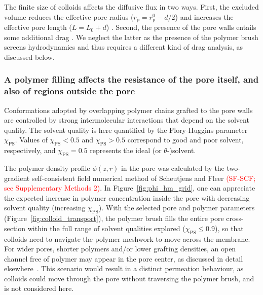 \documentclass[12pt, a4paper]{article}
\newcommand\todo[1]{\textcolor{red}{#1}}
\begin{document}
The finite size of colloids affects the diffusive flux in two ways.
First, the excluded volume reduces the effective pore radius ($r_{\text{p}} = r_{\text{p}}^0 - d/2$) and increases the effective pore length ($L = L_0 + d$) \cite{Renkin1954, Beck1970, Bungay1973, Anderson1974, Brenner1977}.
Second, the presence of the pore walls entails some additional drag \cite{Ladenburg1907, Faxen1922, Haberman1958}.
We neglect the latter as the presence of the polymer brush screens hydrodynamics and thus requires a different kind of drag analysis, as discussed below.


\subsubsection{A polymer filling affects the resistance of the pore itself, and also of regions outside the pore}

Conformations adopted by overlapping polymer chains grafted to the pore walls are controlled by strong intermolecular interactions that depend on the solvent quality.
The solvent quality is here quantified by the Flory-Huggins parameter $\chi_{\text{PS}}$.
Values of $\chi_{\text{PS}}<0.5$ and $\chi_{\text{PS}}>0.5$ correspond to good and poor solvent, respectively, and $\chi_{\text{PS}}=0.5$ represents the ideal (or $\theta$-)solvent.

The polymer density profile $\phi(z,r)$ in the pore was calculated by the two-gradient self-consistent field numerical method of Scheutjens and Fleer 
\todo{(SF-SCF; see Supplementary Methods 2)}. 
In Figure~\ref{fig:phi_hm_grid}, one can appreciate the expected increase in polymer concentration inside the pore with decreasing solvent quality (increasing $\chi_{\text{PS}}$).
With the selected pore and polymer parameters (Figure~\ref{fig:colloid_transport}), the polymer brush fills the entire pore cross-section within the full range of solvent qualities explored ($\chi_{\text{PS}}\le0.9$), so that colloids need to navigate the polymer meshwork to move across the membrane.
For wider pores, shorter polymers and/or lower grafting densities, an open channel free of polymer may appear in the pore center, as discussed in detail elsewhere~\cite{Ligoure2001,Laktionov2021}.
This scenario would result in a distinct permeation behaviour, as colloids could move through the pore without traversing the polymer brush, and is not considered here.
\end{document}
